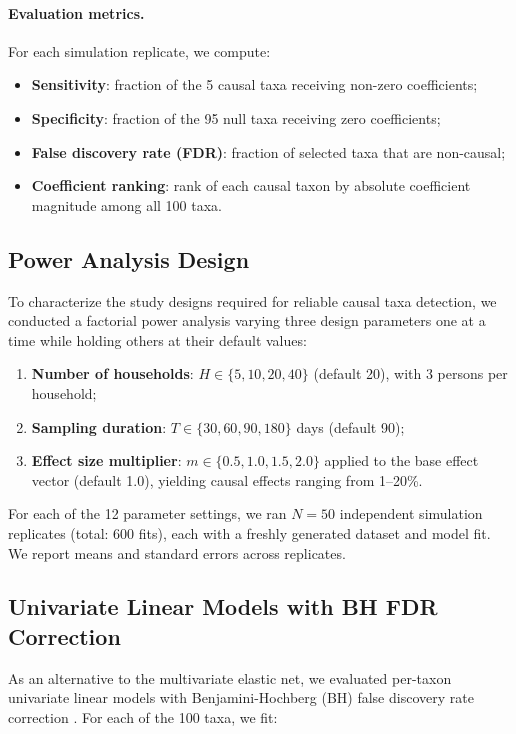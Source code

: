 \documentclass[11pt,letterpaper]{article}
\begin{document}
\paragraph{Evaluation metrics.} For each simulation replicate, we compute:
\begin{itemize}
    \item \textbf{Sensitivity}: fraction of the 5 causal taxa receiving non-zero coefficients;
    \item \textbf{Specificity}: fraction of the 95 null taxa receiving zero coefficients;
    \item \textbf{False discovery rate (FDR)}: fraction of selected taxa that are non-causal;
    \item \textbf{Coefficient ranking}: rank of each causal taxon by absolute coefficient magnitude among all 100 taxa.
\end{itemize}

\subsection{Power Analysis Design}

To characterize the study designs required for reliable causal taxa detection, we conducted a factorial power analysis varying three design parameters one at a time while holding others at their default values:

\begin{enumerate}
    \item \textbf{Number of households}: $H \in \{5, 10, 20, 40\}$ (default 20), with 3 persons per household;
    \item \textbf{Sampling duration}: $T \in \{30, 60, 90, 180\}$ days (default 90);
    \item \textbf{Effect size multiplier}: $m \in \{0.5, 1.0, 1.5, 2.0\}$ applied to the base effect vector (default 1.0), yielding causal effects ranging from 1--20\%.
\end{enumerate}

For each of the 12 parameter settings, we ran $N = 50$ independent simulation replicates (total: 600 fits), each with a freshly generated dataset and model fit. We report means and standard errors across replicates.

\subsection{Univariate Linear Models with BH FDR Correction}

As an alternative to the multivariate elastic net, we evaluated per-taxon univariate linear models with Benjamini-Hochberg (BH) false discovery rate correction \citep{benjamini1995controlling}. For each of the 100 taxa, we fit:
\end{document}
